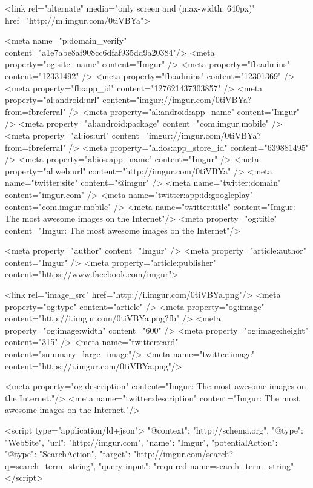                 <link rel="alternate" media="only screen and (max-width: 640px)" href="http://m.imgur.com/0tiVBYa">
    

    <meta name="p:domain_verify" content="a1e7abe8af908cc6dfaf935dd9a20384"/>
    <meta property="og:site_name" content="Imgur" />
    <meta property="fb:admins" content="12331492" />
    <meta property="fb:admins" content="12301369" />
    <meta property="fb:app_id" content="127621437303857" />
    <meta property="al:android:url" content="imgur://imgur.com/0tiVBYa?from=fbreferral" />
    <meta property="al:android:app_name" content="Imgur" />
    <meta property="al:android:package" content="com.imgur.mobile" />
    <meta property="al:ios:url" content="imgur://imgur.com/0tiVBYa?from=fbreferral" />
    <meta property="al:ios:app_store_id" content="639881495" />
    <meta property="al:ios:app_name" content="Imgur" />
    <meta property="al:web:url" content="http://imgur.com/0tiVBYa" />
    <meta name="twitter:site" content="@imgur" />
    <meta name="twitter:domain" content="imgur.com" />
    <meta name="twitter:app:id:googleplay" content="com.imgur.mobile" />
                <meta name="twitter:title" content="Imgur: The most awesome images on the Internet"/>
        <meta property="og:title" content="Imgur: The most awesome images on the Internet"/>
    

    <meta property="author" content="Imgur" />
    <meta property="article:author" content="Imgur" />
    <meta property="article:publisher" content="https://www.facebook.com/imgur">

    

                        <link rel="image_src"            href="http://i.imgur.com/0tiVBYa.png"/>
            <meta property="og:type"         content="article" />
            <meta property="og:image"        content="http://i.imgur.com/0tiVBYa.png?fb" />
            <meta property="og:image:width"  content="600" />
            <meta property="og:image:height" content="315" />
            <meta name="twitter:card"        content="summary_large_image"/>
            <meta name="twitter:image"       content="https://i.imgur.com/0tiVBYa.png"/>
        
    

            <meta property="og:description" content="Imgur: The most awesome images on the Internet."/>
        <meta name="twitter:description" content="Imgur: The most awesome images on the Internet."/>
    

    
    <script type="application/ld+json">
        {
            "@context": "http://schema.org",
            "@type": "WebSite",
            "url": "http://imgur.com",
            "name": "Imgur",
            "potentialAction": {
                "@type": "SearchAction",
                "target": "http://imgur.com/search?q={search_term_string}",
                "query-input": "required name=search_term_string"
            }
        }
    </script>
    
